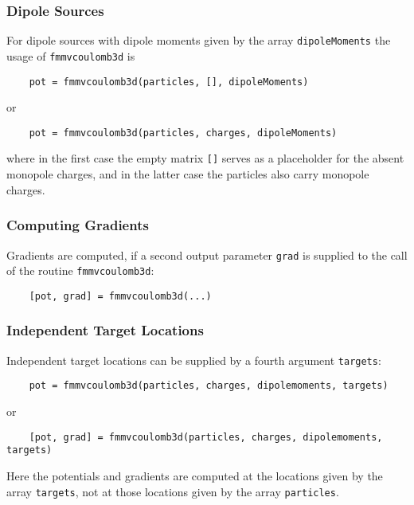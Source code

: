 \subsubsection*{Dipole Sources}
For dipole sources with dipole moments
given by the array \verb|dipoleMoments|
the usage of \verb|fmmvcoulomb3d| is
\begin{verbatim}
    pot = fmmvcoulomb3d(particles, [], dipoleMoments)
\end{verbatim}
or
\begin{verbatim}
    pot = fmmvcoulomb3d(particles, charges, dipoleMoments)
\end{verbatim}
where in the first case the empty matrix \verb|[]| serves as a placeholder
for the absent monopole charges,
and in the latter case the particles also carry monopole charges.
\subsubsection*{Computing Gradients}
Gradients are computed, if a second output parameter \verb|grad| 
is supplied to the call of the routine \verb|fmmvcoulomb3d|:
\begin{verbatim}
    [pot, grad] = fmmvcoulomb3d(...)
\end{verbatim}
\subsubsection*{Independent Target Locations}
Independent target locations can be supplied by a fourth argument
\verb|targets|:
\begin{verbatim}
    pot = fmmvcoulomb3d(particles, charges, dipolemoments, targets)
\end{verbatim}
or
\begin{verbatim}
    [pot, grad] = fmmvcoulomb3d(particles, charges, dipolemoments, targets)
\end{verbatim}
Here the potentials and gradients are computed at the locations
given by the array \verb|targets|, not at those locations given by 
the array \verb|particles|.
